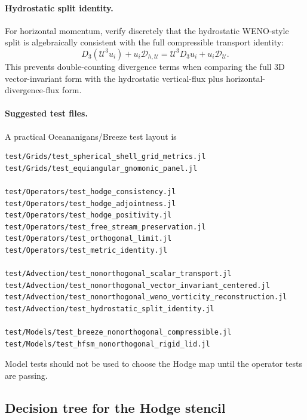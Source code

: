 \documentclass[11pt]{article}
\newcommand{\mc}[1]{\mathcal{#1}}
\newcommand{\Div}{\mc{D}}
\newcommand{\Uflux}{\mc{U}}
\newcommand{\Dmass}{\Div_{\Uflux}}
\newcommand{\Dhmass}{\Div_{h,\Uflux}}
\begin{document}
\paragraph{Hydrostatic split identity.}
For horizontal momentum, verify discretely that the hydrostatic WENO-style split is algebraically consistent with the full compressible transport identity:
\begin{equation}
  D_3(\Uflux^3u_i)+u_i\Dhmass
  =
  \Uflux^3D_3u_i+u_i\Dmass.
  \label{eq:hydrostatic-split-verification}
\end{equation}
This prevents double-counting divergence terms when comparing the full 3D vector-invariant form with the hydrostatic vertical-flux plus horizontal-divergence-flux form.

\paragraph{Suggested test files.}
A practical Oceananigans/Breeze test layout is
\begin{lstlisting}
test/Grids/test_spherical_shell_grid_metrics.jl
test/Grids/test_equiangular_gnomonic_panel.jl

test/Operators/test_hodge_consistency.jl
test/Operators/test_hodge_adjointness.jl
test/Operators/test_hodge_positivity.jl
test/Operators/test_free_stream_preservation.jl
test/Operators/test_orthogonal_limit.jl
test/Operators/test_metric_identity.jl

test/Advection/test_nonorthogonal_scalar_transport.jl
test/Advection/test_nonorthogonal_vector_invariant_centered.jl
test/Advection/test_nonorthogonal_weno_vorticity_reconstruction.jl
test/Advection/test_hydrostatic_split_identity.jl

test/Models/test_breeze_nonorthogonal_compressible.jl
test/Models/test_hfsm_nonorthogonal_rigid_lid.jl
\end{lstlisting}
Model tests should not be used to choose the Hodge map until the operator tests are passing.

\subsection{Decision tree for the Hodge stencil}
\label{subsec:hodge-decision-tree}
\end{document}
